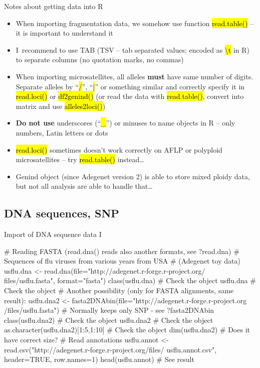 \documentclass[compress, ucs, xelatex, 11pt, xcolor=svgnames,
  hyperref={
    bookmarks=true,
    unicode=true,
    colorlinks=true,
    pdftitle={Molecular data in R},
    plainpages=false,
    pdfauthor={Vojtech Zeisek},
    pdfsubject={Course about phylogeny and evolution in R},
    pdfcreator={XeLaTeX},
    pdfkeywords={R, evolution, phylogeny, molecular data},
    linkcolor=Tomato,
    anchorcolor=SaddleBrown,
    citecolor=Goldenrod,
    filecolor=DarkMagenta,
    menucolor=Sienna,
    urlcolor=DarkTurquoise,
    pdftex},
  url={hyphens, lowtilde} %
  ]{beamer}
\renewcommand{\texttt}[1]{\hl{\ttfamily #1}}
\begin{document}
\begin{frame}{Notes about getting data into R}
  \begin{itemize}
    \item When importing fragmentation data, we somehow use function \texttt{read.table()} -- it is important to understand it
    \item I~recommend to use TAB (TSV -- tab separated values; encoded as \texttt{\textbackslash t} in R) to separate columns (no quotation marks, no commas)
    \item When importing microsatellites, all alleles \textbf{must} have same number of digits. Separate alleles by ``\texttt{/}'', ``\texttt{|}'' or something similar and correctly specify it in \texttt{read.loci()} or \texttt{df2genind()} (or read the data with \texttt{read.table()}, convert into matrix and use \texttt{alleles2loci()})
    \item \textbf{Do not use} underscores (``\texttt{\_}'') or minuses to name objects in R -- only numbers, Latin letters or dots
    \item \texttt{read.loci()} sometimes doesn't work correctly on AFLP or polyploid microsatellites -- try \texttt{read.table()} instead\ldots
    \item Genind object (since Adegenet version 2) is able to store mixed ploidy data, but not all analysis are able to handle that\ldots
  \end{itemize}
\end{frame}

\subsection{DNA sequences, SNP}

\begin{frame}[fragile]{Import of DNA sequence data I}
  \begin{spluscode}
    # Reading FASTA (read.dna() reads also another formats, see ?read.dna)
    # Sequences of flu viruses from various years from USA
    # (Adegenet toy data)
    usflu.dna <- read.dna(file="http://adegenet.r-forge.r-project.org/
      files/usflu.fasta", format="fasta")
    class(usflu.dna) # Check the object
    usflu.dna # Check the object
    # Another possibility (only for FASTA alignments, same result):
    usflu.dna2 <- fasta2DNAbin(file="http://adegenet.r-forge.r-project.org
      /files/usflu.fasta") # Normally keeps only SNP - see ?fasta2DNAbin
    class(usflu.dna2) # Check the object
    usflu.dna2 # Check the object
    as.character(usflu.dna2)[1:5,1:10] # Check the object
    dim(usflu.dna2) # Does it have correct size?
    # Read annotations
    usflu.annot <- read.csv("http://adegenet.r-forge.r-project.org/files/
      usflu.annot.csv", header=TRUE, row.names=1)
    head(usflu.annot) # See result
  \end{spluscode}
\end{frame}
\end{document}
